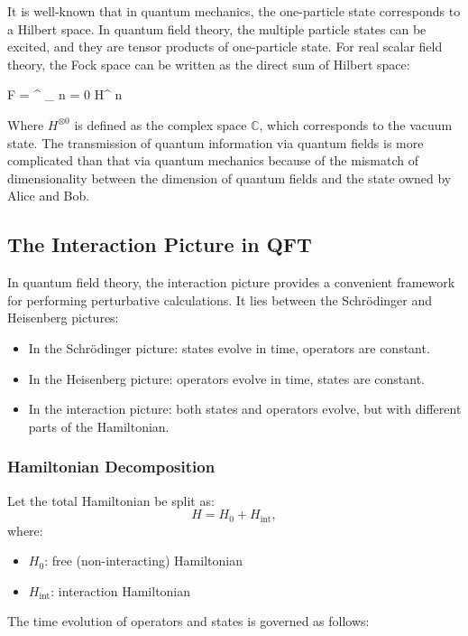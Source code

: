 \documentclass[a4paper,12pt]{article}
\begin{document}
It is well-known that in quantum mechanics, the one-particle state corresponds to a Hilbert space.
In quantum field theory, the multiple particle states can be excited, and they are tensor products of one-particle state.
For real scalar field theory, the Fock space can be written as the direct sum of Hilbert space:

\be
    F = \bigoplus^{ \infty }_{ n = 0 } H^{ \otimes n }
\ee

Where $ H^{ \otimes 0 } $ is defined as the complex space $ \mathbb{ C } $, which corresponds to the vacuum state.
The transmission of quantum information via quantum fields is more complicated than that via quantum mechanics because of the mismatch of dimensionality between the dimension of quantum fields and the state owned by Alice and Bob.
\subsection*{The Interaction Picture in QFT}

In quantum field theory, the interaction picture provides a convenient framework for performing perturbative calculations. It lies between the Schrödinger and Heisenberg pictures:

\begin{itemize}
    \item In the Schrödinger picture: states evolve in time, operators are constant.
    \item In the Heisenberg picture: operators evolve in time, states are constant.
    \item In the interaction picture: both states and operators evolve, but with different parts of the Hamiltonian.
\end{itemize}

\subsubsection*{Hamiltonian Decomposition}

Let the total Hamiltonian be split as:
\begin{equation}
H = H_0 + H_{\text{int}},
\end{equation}
where:
\begin{itemize}
    \item $H_0$: free (non-interacting) Hamiltonian
    \item $H_{\text{int}}$: interaction Hamiltonian
\end{itemize}

The time evolution of operators and states is governed as follows:
\end{document}
